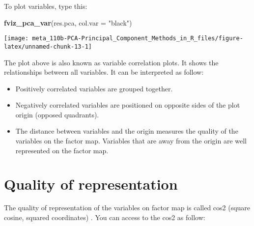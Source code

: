 \documentclass[]{book}
\newenvironment{Shaded}{\begin{snugshade}}{\end{snugshade}}
\newcommand{\CommentTok}[1]{\textcolor[rgb]{0.56,0.35,0.01}{\textit{#1}}}
\newcommand{\DataTypeTok}[1]{\textcolor[rgb]{0.13,0.29,0.53}{#1}}
\newcommand{\DecValTok}[1]{\textcolor[rgb]{0.00,0.00,0.81}{#1}}
\newcommand{\KeywordTok}[1]{\textcolor[rgb]{0.13,0.29,0.53}{\textbf{#1}}}
\newcommand{\NormalTok}[1]{#1}
\newcommand{\OperatorTok}[1]{\textcolor[rgb]{0.81,0.36,0.00}{\textbf{#1}}}
\newcommand{\StringTok}[1]{\textcolor[rgb]{0.31,0.60,0.02}{#1}}
\providecommand{\tightlist}{%
  \setlength{\itemsep}{0pt}\setlength{\parskip}{0pt}}
\begin{document}
\begin{Shaded}
\end{Shaded}

To plot variables, type this:

\begin{Shaded}
\begin{Highlighting}[]
\KeywordTok{fviz_pca_var}\NormalTok{(res.pca, }\DataTypeTok{col.var =} \StringTok{"black"}\NormalTok{)}
\end{Highlighting}
\end{Shaded}

\begin{center}\texttt{[image: meta\_110b-PCA-Principal\_Component\_Methods\_in\_R\_files/figure-latex/unnamed-chunk-13-1]} \end{center}

The plot above is also known as variable correlation plots. It shows the relationships between all variables. It can be interpreted as follow:

\begin{itemize}
\tightlist
\item
  Positively correlated variables are grouped together.
\item
  Negatively correlated variables are positioned on opposite sides of the plot origin (opposed quadrants).
\item
  The distance between variables and the origin measures the quality of the variables on the factor map. Variables that are away from the origin are well represented on the factor map.
\end{itemize}

\hypertarget{quality-of-representation}{%
\section{Quality of representation}\label{quality-of-representation}}

The quality of representation of the variables on factor map is called cos2 (square cosine, squared coordinates) . You can access to the cos2 as follow:
\end{document}
